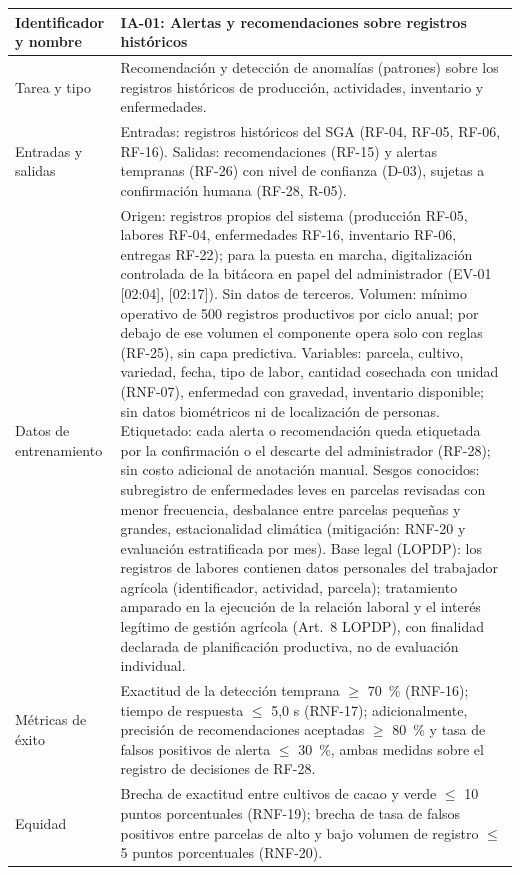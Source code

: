 \documentclass[12pt,a4paper]{article}
\begin{document}
\begin{center}
\begin{longtable}{|p{4.2cm}|p{10cm}|}
\hline
Identificador y nombre & IA-01: Alertas y recomendaciones sobre registros históricos \\
\hline
Tarea y tipo & Recomendación y detección de anomalías (patrones) sobre los registros históricos de producción, actividades, inventario y enfermedades. \\
\hline
Entradas y salidas & Entradas: registros históricos del SGA (RF-04, RF-05, RF-06, RF-16). Salidas: recomendaciones (RF-15) y alertas tempranas (RF-26) con nivel de confianza (D-03), sujetas a confirmación humana (RF-28, R-05). \\
\hline
Datos de entrenamiento & Origen: registros propios del sistema (producción RF-05, labores RF-04, enfermedades RF-16, inventario RF-06, entregas RF-22); para la puesta en marcha, digitalización controlada de la bitácora en papel del administrador (EV-01 [02:04], [02:17]). Sin datos de terceros. Volumen: mínimo operativo de 500 registros productivos por ciclo anual; por debajo de ese volumen el componente opera solo con reglas (RF-25), sin capa predictiva. Variables: parcela, cultivo, variedad, fecha, tipo de labor, cantidad cosechada con unidad (RNF-07), enfermedad con gravedad, inventario disponible; sin datos biométricos ni de localización de personas. Etiquetado: cada alerta o recomendación queda etiquetada por la confirmación o el descarte del administrador (RF-28); sin costo adicional de anotación manual. Sesgos conocidos: subregistro de enfermedades leves en parcelas revisadas con menor frecuencia, desbalance entre parcelas pequeñas y grandes, estacionalidad climática (mitigación: RNF-20 y evaluación estratificada por mes). Base legal (LOPDP): los registros de labores contienen datos personales del trabajador agrícola (identificador, actividad, parcela); tratamiento amparado en la ejecución de la relación laboral y el interés legítimo de gestión agrícola (Art.~8 LOPDP), con finalidad declarada de planificación productiva, no de evaluación individual. \\
\hline
Métricas de éxito & Exactitud de la detección temprana $\geq$ 70~\% (RNF-16); tiempo de respuesta $\leq$ 5,0 s (RNF-17); adicionalmente, precisión de recomendaciones aceptadas $\geq$ 80~\% y tasa de falsos positivos de alerta $\leq$ 30~\%, ambas medidas sobre el registro de decisiones de RF-28. \\
\hline
Equidad & Brecha de exactitud entre cultivos de cacao y verde $\leq$ 10 puntos porcentuales (RNF-19); brecha de tasa de falsos positivos entre parcelas de alto y bajo volumen de registro $\leq$ 5 puntos porcentuales (RNF-20). \\

\end{longtable}
\end{center}
\end{document}
